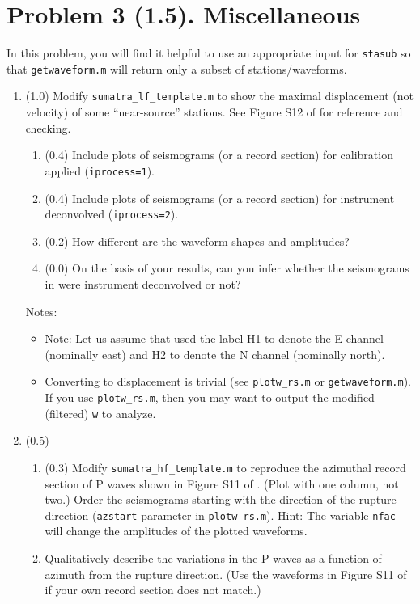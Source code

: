 \documentclass[11pt,titlepage,fleqn]{article}
\begin{document}

\section*{Problem 3 (1.5). Miscellaneous}

In this problem, you will find it helpful to use an appropriate input for \verb+stasub+ so that \verb+getwaveform.m+ will return only a subset of stations/waveforms.

\begin{enumerate}
\item (1.0) Modify \verb+sumatra_lf_template.m+ to show the maximal displacement (not velocity) of some ``near-source'' stations. See Figure S12 of \citet{Ammon2005} for reference and checking.

%
\begin{enumerate}
\item (0.4) Include plots of seismograms (or a record section) for calibration applied (\verb+iprocess=1+).
\item (0.4) Include plots of seismograms (or a record section) for instrument deconvolved (\verb+iprocess=2+).
\item (0.2) How different are the waveform shapes and amplitudes?
\item (0.0) On the basis of your results, can you infer whether the seismograms in \citet{Ammon2005} were instrument deconvolved or not?
\end{enumerate}
%
Notes:
%
\begin{itemize}
\item Note: Let us assume that \citet{Ammon2005} used the label H1 to denote the E channel (nominally east) and H2 to denote the N channel (nominally north).

\item Converting to displacement is trivial (see \verb+plotw_rs.m+ or \verb+getwaveform.m+). If you use \verb+plotw_rs.m+, then you may want to output the modified (\ie filtered) \verb+w+ to analyze.

\end{itemize}


\item (0.5) 
%
\begin{enumerate}
\item (0.3) Modify \verb+sumatra_hf_template.m+ to reproduce the azimuthal record section of P waves shown in Figure S11 of \citet{Ammon2005}. (Plot with one column, not two.) Order the seismograms starting with the direction of the rupture direction (\verb+azstart+ parameter in \verb+plotw_rs.m+).
Hint: The variable \verb+nfac+ will change the amplitudes of the plotted waveforms.
\item Qualitatively describe the variations in the P waves as a function of azimuth from the rupture direction. (Use the waveforms in Figure S11 of \citet{Ammon2005} if your own record section does not match.)
\end{enumerate}


\end{enumerate}
\end{document}
